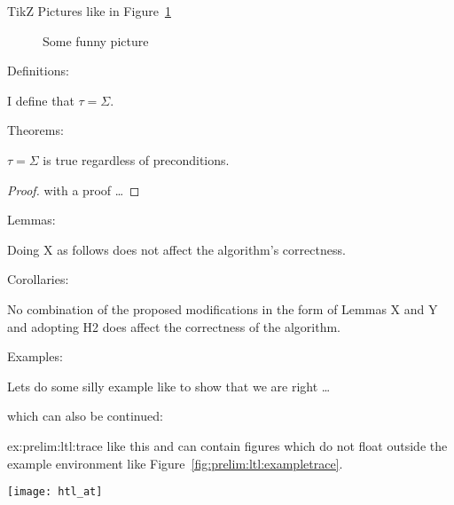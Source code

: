 TikZ Pictures like in Figure~\ref{fig:def:prelim:ltl:kl-loop}
\begin{figure}
  \centering
  \caption{Some funny picture}
  \label{fig:def:prelim:ltl:kl-loop}
\end{figure}

Definitions:
\begin{definition}[Trace]\label{def:prelim:ltl:trace}
  I define that  $\tau = \Sigma$.
\end{definition}

Theorems:
\begin{theorem} \label{thm:enc:enc:basic}
	$\tau = \Sigma$ is true regardless of preconditions. 
\end{theorem}
\begin{proof}
with a proof \ldots 
\end{proof}

Lemmas:
\begin{lemma}
Doing X as follows does not affect the algorithm's correctness. 
\end{lemma}

Corollaries:
\begin{corollary} 
	No combination of the proposed modifications in the form of Lemmas X and Y and adopting H2 does affect the correctness of the algorithm.
\end{corollary}


Examples:

\begin{example} \label{ex:prelim:ltl:trace}
Lets do some silly example like to show that we are right \ldots
\end{example}

which can also be continued:

\begin{examplecont}{ex:prelim:ltl:trace}
	 like this and can contain figures which do not float outside the example 
	 environment like Figure~\ref{fig:prelim:ltl:exampletrace}.

	 \begin{fakefigure}
	  \vspace*{-1em}
		\centering
		\captionsetup{type=figure}
		\texttt{[image: htl\_at]}
		\label{fig:prelim:ltl:exampletrace}
	\end{fakefigure}
\end{examplecont}

